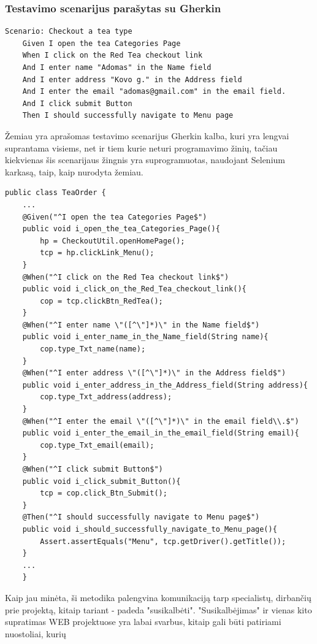 \documentclass[a4paper,12pt,fleqn]{article}
\begin{document}
\subsubsection{Testavimo scenarijus parašytas su Gherkin}
\begin{lstlisting}[caption={Gherkin kalba parašytas testas.}]
  Scenario: Checkout a tea type
    Given I open the tea Categories Page
    When I click on the Red Tea checkout link
    And I enter name "Adomas" in the Name field
    And I enter address "Kovo g." in the Address field
    And I enter the email "adomas@gmail.com" in the email field.
    And I click submit Button
    Then I should successfully navigate to Menu page
\end{lstlisting}

Žemiau yra aprašomas testavimo scenarijus Gherkin kalba, kuri yra lengvai suprantama visiems, net ir tiem kurie neturi programavimo žinių, tačiau kiekvienas šis scenarijaus žingnis yra suprogramuotas, naudojant Selenium karkasą, taip, kaip nurodyta žemiau.

\begin{lstlisting}[caption={Gherkin testas įgyvendintas naudojant Selenium karkasą ir Java kalbą.}]
public class TeaOrder {
    ...
    @Given("^I open the tea Categories Page$")
    public void i_open_the_tea_Categories_Page(){
        hp = CheckoutUtil.openHomePage();
        tcp = hp.clickLink_Menu();
    }
    @When("^I click on the Red Tea checkout link$")
    public void i_click_on_the_Red_Tea_checkout_link(){
        cop = tcp.clickBtn_RedTea();
    }
    @When("^I enter name \"([^\"]*)\" in the Name field$")
    public void i_enter_name_in_the_Name_field(String name){
        cop.type_Txt_name(name);
    }
    @When("^I enter address \"([^\"]*)\" in the Address field$")
    public void i_enter_address_in_the_Address_field(String address){
        cop.type_Txt_address(address);
    }
    @When("^I enter the email \"([^\"]*)\" in the email field\\.$")
    public void i_enter_the_email_in_the_email_field(String email){
        cop.type_Txt_email(email);
    }
    @When("^I click submit Button$")
    public void i_click_submit_Button(){
        tcp = cop.click_Btn_Submit();
    }
    @Then("^I should successfully navigate to Menu page$")
    public void i_should_successfully_navigate_to_Menu_page(){
        Assert.assertEquals("Menu", tcp.getDriver().getTitle());
    }
    ...
    }
\end{lstlisting}

Kaip jau minėta, ši metodika palengvina komunikaciją tarp specialistų, dirbančių prie projektą, kitaip tariant - padeda "susikalbėti". "Susikalbėjimas" ir vienas kito supratimas WEB projektuose yra labai svarbus, kitaip gali būti patiriami nuostoliai, kurių 
\end{document}
